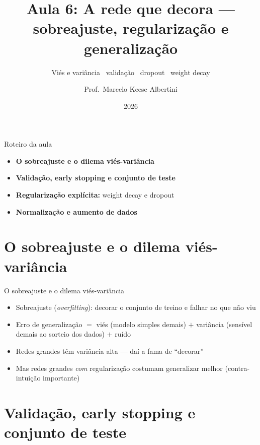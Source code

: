 \documentclass[aspectratio=169, 11pt]{beamer}
\title[Aula 6 — Generalização]{Aula 6: A rede que decora — sobreajuste, regularização e generalização}
\subtitle[GBC073 — Inteligência Computacional]{Viés e variância \textbullet\ validação \textbullet\ dropout \textbullet\ weight decay}
\author[Prof.\ Marcelo Albertini]{Prof.\ Marcelo Keese Albertini}
\institute{GBC073 — Inteligência Computacional \textbullet\ Universidade Federal de Uberlândia}
\date{2026}
\begin{document}
\begin{frame}
  \titlepage
\end{frame}

\begin{frame}{Roteiro da aula}
  \begin{itemize}\setlength{\itemsep}{0.5ex}
    \item<1-> \textbf{O sobreajuste e o dilema viés-variância}
    \item<2-> \textbf{Validação, early stopping e conjunto de teste}
    \item<3-> \textbf{Regularização explícita:} weight decay e dropout
    \item<4-> \textbf{Normalização e aumento de dados}
  \end{itemize}
\end{frame}

\section{O sobreajuste e o dilema viés-variância}

\begin{frame}{O sobreajuste e o dilema viés-variância}
  \begin{itemize}\setlength{\itemsep}{0.4ex}
    \item Sobreajuste (\emph{overfitting}): decorar o conjunto de treino e
          falhar no que não viu
    \item Erro de generalização $=$ viés (modelo simples demais) $+$ variância
          (sensível demais ao sorteio dos dados) $+$ ruído
    \item Redes grandes têm variância alta — daí a fama de ``decorar''
    \item Mas redes grandes \emph{com} regularização costumam generalizar
          melhor (contra-intuição importante)
  \end{itemize}
\end{frame}

\section{Validação, early stopping e conjunto de teste}
\end{document}
